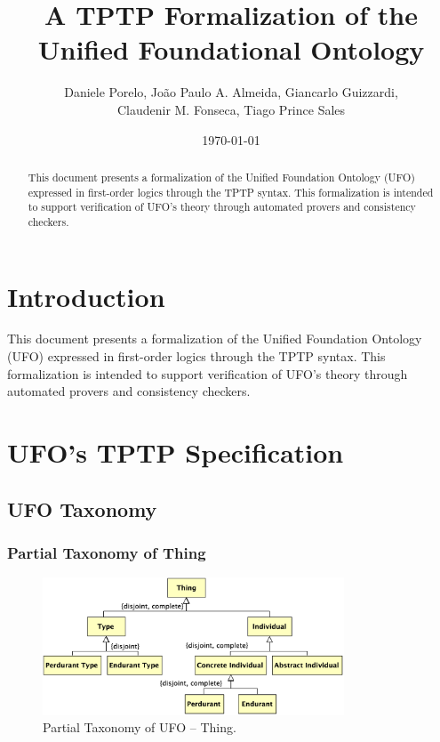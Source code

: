 \documentclass{article}
\title{A TPTP Formalization of the Unified Foundational Ontology}
\author{
    Daniele Porelo,
    Jo\~ao Paulo A. Almeida,
    Giancarlo Guizzardi,\\
    Claudenir M. Fonseca,
    Tiago Prince Sales
}
\date{\today}
\begin{document}
\maketitle

\begin{abstract}
This document presents a formalization of the Unified Foundation Ontology (UFO) expressed in first-order logics through the TPTP syntax. This formalization is intended to support verification of UFO's theory through automated provers and consistency checkers.
\end{abstract}

\section{Introduction}

This document presents a formalization of the Unified Foundation Ontology (UFO) expressed in first-order logics through the TPTP syntax. This formalization is intended to support verification of UFO's theory through automated provers and consistency checkers.

\section{UFO's TPTP Specification}

\subsection{UFO Taxonomy}

\subsubsection{Partial Taxonomy of Thing}

\begin{figure}[ht]
    \centering
    \includegraphics[width=0.8\textwidth]{diagrams/Thing_Diagram.png}
    \caption{Partial Taxonomy of UFO -- Thing.}
    \label{fig:ufo_taxonomy_thing}
\end{figure}
\end{document}
